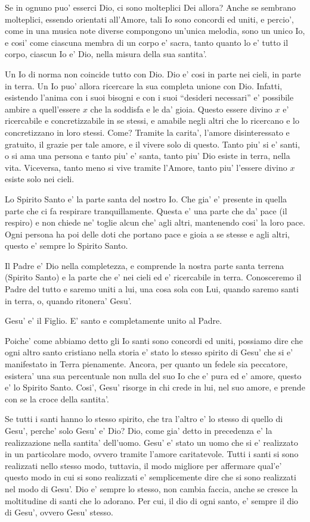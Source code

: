 Se in ognuno puo' esserci Dio, ci sono molteplici Dei allora? Anche se sembrano molteplici, essendo orientati all'Amore, tali Io sono concordi ed uniti, e percio', come in una musica note diverse compongono un'unica melodia, sono un unico Io, e cosi' come ciascuna membra di un corpo e' sacra, tanto quanto lo e' tutto il corpo, ciascun Io e' Dio, nella misura della sua santita'.

Un Io di norma non coincide tutto con Dio. Dio e' cosi in parte nei cieli, in parte in terra. Un Io puo' allora ricercare la sua completa unione con Dio. Infatti, esistendo l'anima con i suoi bisogni e con i suoi ``desideri necessari'' e' possibile ambire a quell'essere $x$ che la soddisfa e le da' gioia. Questo essere divino $x$ e' ricercabile e concretizzabile in se stessi, e amabile negli altri che lo ricercano e lo concretizzano in loro stessi. Come? Tramite la carita',  l'amore disinteressato e gratuito, il grazie per tale amore, e il vivere solo di questo. Tanto piu' si e' santi, o si ama una persona e tanto piu' e' santa, tanto piu' Dio esiste in terra, nella vita. Viceversa, tanto meno si vive tramite l'Amore, tanto piu' l'essere divino $x$ esiste solo nei cieli. 

Lo Spirito Santo e' la parte santa del nostro Io. Che gia' e' presente in quella parte che ci fa respirare tranquillamente. Questa e' una parte che da' pace (il respiro) e non chiede ne' toglie alcun che' agli altri, mantenendo cosi' la loro pace. Ogni persona ha poi delle doti che portano pace e gioia a se stesse e agli altri, questo e' sempre lo Spirito Santo.

Il Padre e' Dio nella completezza, e comprende la nostra parte santa terrena (Spirito Santo) e la parte che e' nei cieli ed e' ricercabile in terra. Conosceremo il Padre del tutto e saremo uniti a lui, una cosa sola con Lui, quando saremo santi in terra, o, quando ritonera' Gesu'.

Gesu' e' il Figlio. E' santo e completamente unito al Padre. 

Poiche' come abbiamo detto gli Io santi sono concordi ed uniti, possiamo dire che ogni altro santo cristiano nella storia e' stato lo stesso spirito di Gesu' che si e' manifestato in Terra pienamente. Ancora, per quanto un fedele sia peccatore, esistera' una sua percentuale non nulla del suo Io che e' pura ed e' amore, questo e' lo Spirito Santo. Cosi', Gesu' risorge in chi crede in lui, nel suo amore, e prende con se la croce della santita'.

Se tutti i santi hanno lo stesso spirito, che tra l'altro e' lo stesso di quello di Gesu', perche' solo Gesu' e' Dio? Dio, come gia' detto in precedenza e' la realizzazione nella santita' dell'uomo. Gesu' e' stato un uomo che si e' realizzato in un particolare modo, ovvero tramite l'amore caritatevole. Tutti i santi si sono realizzati nello stesso modo, tuttavia, il modo migliore per affermare qual'e' questo modo in cui si sono realizzati e' semplicemente dire che si sono realizzati nel modo di Gesu'. Dio e' sempre lo stesso, non cambia faccia, anche se cresce la moltitudine di santi che lo adorano. Per cui, il dio di ogni santo, e' sempre il dio di Gesu', ovvero Gesu' stesso.

